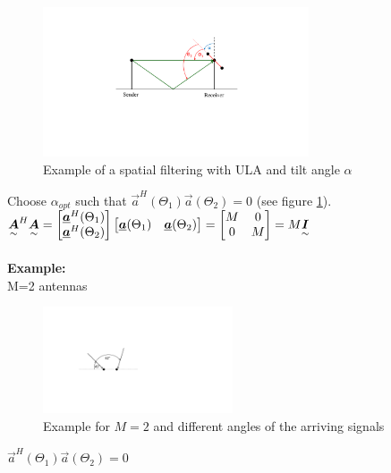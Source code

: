 \begin{doublespace}
\begin{figure}[H]
	\centering
		\includegraphics[trim =6cm 7cm 6cm 4cm, clip, width=0.70\textwidth]{graphics/Spatial_filtering_antenna_example_alpha_opt.pdf}
	\caption{Example of a spatial filtering with ULA and tilt angle $\alpha$}
	\label{fig:Spatial_filtering_antenna_example_alpha_opt}
\end{figure}
Choose $\alpha_{opt}$ such that $\vec{a}^H(\Theta_1)\vec{a}(\Theta_2)=0$ (see figure \ref{fig:Spatial_filtering_antenna_example_alpha_opt}).\\
$\underset{\sim}{\boldsymbol {A}}^H\underset{\sim}{\boldsymbol {A}}=\begin{bmatrix} \underline{\boldsymbol {a}}^H(\Theta_1)\\\underline{\boldsymbol {a}}^H(\Theta_2) \end{bmatrix}\begin{bmatrix} \underline{\boldsymbol {a}}(\Theta_1)&\underline{\boldsymbol {a}}(\Theta_2) \end{bmatrix}=\begin{bmatrix} M&0\\0&M \end{bmatrix}=M\underset{\sim}{\boldsymbol {I}}$\\ \\

\textbf{Example:}\\
M=2  antennas\\
\begin{figure}[H]
	\centering
		\includegraphics[trim =6cm 7.5cm 14cm 4cm, clip, width=0.50\textwidth]{graphics/LS_filter_example_two_antenna.pdf}
	\caption{Example for $M=2$ and different angles of the arriving signals}
	\label{fig:LS_filter_example_two_antenna}
\end{figure}
$\vec{a}^H(\Theta_1)\vec{a}(\Theta_2)=0$
\end{doublespace}

